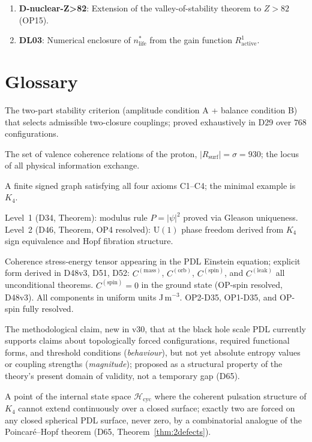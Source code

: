 \documentclass[11pt,a4paper]{article}
\theoremstyle{plain}
\theoremstyle{definition}
\theoremstyle{remark}
\newcommand{\Kfour}{K_4}
\newcommand{\Rsurf}{R_{\mathrm{surf}}}
\newcommand{\Ccoh}{C_{\mathrm{coh}}}
\begin{document}
\begin{enumerate}
\item \textbf{D-nuclear-Z>82}: Extension of the valley-of-stability theorem to $Z>82$ (OP15).
\item \textbf{DL03}: Numerical enclosure of $n^*_{\mathrm{life}}$ from the gain function $R^1_{\mathrm{active}}$.
\end{enumerate}

\section{Glossary}
\label{sec:glossary}

\begin{description}[leftmargin=3.5cm, style=nextline]
\item[AB criterion] The two-part stability criterion (amplitude condition A + balance condition B) that selects admissible two-closure couplings; proved exhaustively in D29 over $768$ configurations.
\item[Active surface $\Rsurf$] The set of valence coherence relations of the proton, $|\Rsurf|=\sigma=930$; the locus of all physical information exchange.
\item[Admissible closure] A finite signed graph satisfying all four axioms C1--C4; the minimal example is $K_4$.
\item[Born Level~1 / Level~2] Level~1 (D34, Theorem): modulus rule $P=|\psi|^2$ proved via Gleason uniqueness. Level~2 (D46, Theorem, OP4 resolved): $\mathrm{U}(1)$ phase freedom derived from $K_4$ sign equivalence and Hopf fibration structure.
\item[$\Ccoh$] Coherence stress-energy tensor appearing in the PDL Einstein equation; explicit form derived in D48v3, D51, D52: $C^{(\mathrm{mass})}$, $C^{(\mathrm{orb})}$, $C^{(\mathrm{spin})}$, and $C^{(\mathrm{leak})}$ all unconditional theorems. $C^{(\mathrm{spin})}=0$ in the ground state (OP-spin resolved, D48v3). All components in uniform units J\,m$^{-3}$. OP2-D35, OP1-D35, and OP-spin fully resolved. 
\item[Behaviour-versus-magnitude principle] The methodological claim, new in v30, that at the black hole scale PDL currently supports claims about topologically forced configurations, required functional forms, and threshold conditions (\emph{behaviour}), but not yet absolute entropy values or coupling strengths (\emph{magnitude}); proposed as a structural property of the theory's present domain of validity, not a temporary gap (D65).
\item[Coherence defect] A point of the internal state space $\mathcal{H}_{\mathrm{cyc}}$ where the coherent pulsation structure of $\Kfour$ cannot extend continuously over a closed surface; exactly two are forced on any closed spherical PDL surface, never zero, by a combinatorial analogue of the Poincar\'e--Hopf theorem (D65, Theorem~\ref{thm:2defects}).

\end{description}
\end{document}
